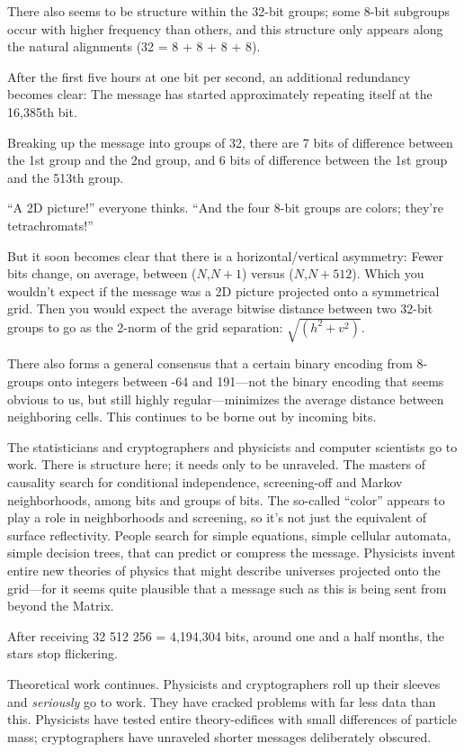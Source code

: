 {
 There also seems to be structure within the 32-bit groups; some
8-bit subgroups occur with higher frequency than others, and this
structure only appears along the natural alignments (32 = 8 + 8 + 8 +
8).}

{
 After the first five hours at one bit per second, an additional
redundancy becomes clear: The message has started approximately
repeating itself at the 16,385th bit.}

{
 Breaking up the message into groups of 32, there are 7 bits of
difference between the 1st group and the 2nd group, and 6 bits of
difference between the 1st group and the 513th group.}

{
 ``A 2D picture!'' everyone
thinks. ``And the four 8-bit groups are colors;
they're tetrachromats!''}

{
 But it soon becomes clear that there is a horizontal/vertical
asymmetry: Fewer bits change, on average, between ($N$,$N + 1$) versus ($N$,$N
+ 512$). Which you wouldn't expect if the message was a
2D picture projected onto a symmetrical grid. Then you would expect the
average bitwise distance between two 32-bit groups to go as the 2-norm
of the grid separation: $\sqrt{(h^2 + v^2)}$.}

{
 There also forms a general consensus that a certain binary
encoding from 8-groups onto integers between -64 and 191---not the
binary encoding that seems obvious to us, but still highly
regular---minimizes the average distance between neighboring cells.
This continues to be borne out by incoming bits.}

{
 The statisticians and cryptographers and physicists and computer
scientists go to work. There is structure here; it needs only to be
unraveled. The masters of causality search for conditional
independence, screening-off and Markov neighborhoods, among bits and
groups of bits. The so-called
``color'' appears to play a role in
neighborhoods and screening, so it's not just the
equivalent of surface reflectivity. People search for simple equations,
simple cellular automata, simple decision trees, that can predict or
compress the message. Physicists invent entire new theories of physics
that might describe universes projected onto the grid---for it seems
quite plausible that a message such as this is being sent from beyond
the Matrix.}

{
 After receiving 32 {\texttimes} 512 {\texttimes} 256 = 4,194,304
bits, around one and a half months, the stars stop flickering.}

{
 Theoretical work continues. Physicists and cryptographers roll up
their sleeves and \textit{seriously} go to work. They have cracked
problems with far less data than this. Physicists have tested entire
theory-edifices with small differences of particle mass; cryptographers
have unraveled shorter messages deliberately obscured.}


